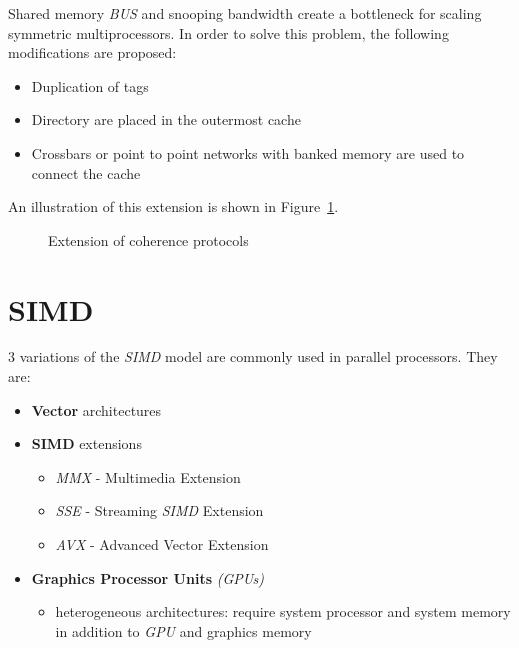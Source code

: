 \documentclass[english]{article}
\begin{document}
Shared memory \textit{BUS} and snooping bandwidth create a bottleneck for scaling symmetric multiprocessors.
In order to solve this problem, the following modifications are proposed:

\begin{itemize}
  \item Duplication of tags
  \item Directory are placed in the outermost cache
  \item Crossbars or point to point networks with banked memory are used to connect the cache
\end{itemize}

\bigskip
An illustration of this extension is shown in Figure~\ref{fig:MESI-extension}.

\begin{figure}[htbp]
  \bigskip
  \centering
  \caption{Extension of coherence protocols}
  \label{fig:MESI-extension}
  \bigskip
\end{figure}

\clearpage

\section{SIMD}
\label{sec:simd}

\(3\) variations of the \textit{SIMD} model are commonly used in parallel processors.
They are:

\begin{itemize}
  \item \textbf{Vector} architectures
  \item \textbf{SIMD} extensions
        \begin{itemize}
          \item \textit{MMX} - Multimedia Extension
          \item \textit{SSE} - Streaming \textit{SIMD} Extension
          \item \textit{AVX} - Advanced Vector Extension
        \end{itemize}
  \item \textbf{Graphics Processor Units} \textit{(GPUs)}
        \begin{itemize}
          \item heterogeneous architectures: require system processor and system memory in addition to \textit{GPU} and graphics memory
        \end{itemize}
\end{itemize}
\end{document}
